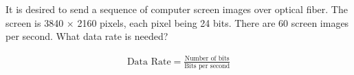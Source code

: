
\section{}
It is desired to send a sequence of computer screen images over optical fiber. The screen is 3840 $\times$ 2160 pixels, each pixel being 24 bits. There are 60 screen images per second. What data rate is needed?

\begin{align*}
	\text{Data Rate} = \frac{\text{Number of bits}}{\text{Bits per second}}
\end{align*}

\section{}
\section{}
\section{}
\section{}
\section{}
\section{}
